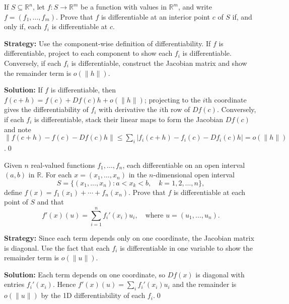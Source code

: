 \begin{problembox}
\begin{problemstatement}
If \( S \subseteq \mathbb{R}^n \), let \( f: S \to \mathbb{R}^m \) be a function with values in \( \mathbb{R}^m \), and write \( f = (f_1, \ldots, f_m) \). Prove that \( f \) is differentiable at an interior point \( c \) of \( S \) if, and only if, each \( f_i \) is differentiable at \( c \).
\end{problemstatement}
\end{problembox}

\noindent\textbf{Strategy:} Use the component-wise definition of differentiability. If \( f \) is differentiable, project to each component to show each \( f_i \) is differentiable. Conversely, if each \( f_i \) is differentiable, construct the Jacobian matrix and show the remainder term is \( o(\|h\|) \).

\bigskip\noindent\textbf{Solution:}
If $f$ is differentiable, then $f(c+h)=f(c)+Df(c)h+o(\|h\|)$; projecting to the $i$th coordinate gives the differentiability of $f_i$ with derivative the $i$th row of $Df(c)$. Conversely, if each $f_i$ is differentiable, stack their linear maps to form the Jacobian $Df(c)$ and note $\|f(c+h)-f(c)-Df(c)h\|\le\sum_i |f_i(c+h)-f_i(c)-Df_i(c)h|=o(\|h\|)$.\qed


\begin{problembox}
\begin{problemstatement}
Given \( n \) real-valued functions \( f_1, \ldots, f_n \), each differentiable on an open interval \( (a, b) \) in \( \mathbb{R} \). For each \( x = (x_1, \ldots, x_n) \) in the \( n \)-dimensional open interval
\[S = \{(x_1, \ldots, x_n): a < x_k < b, \quad k = 1, 2, \ldots, n\},\]
define \( f(x) = f_1(x_1) + \cdots + f_n(x_n) \). Prove that \( f \) is differentiable at each point of \( S \) and that
\[f'(x)(u) = \sum_{i=1}^{n} f_i'(x_i)u_i, \quad \text{where } u = (u_1, \ldots, u_n).\]
\end{problemstatement}
\end{problembox}

\noindent\textbf{Strategy:} Since each term depends only on one coordinate, the Jacobian matrix is diagonal. Use the fact that each \( f_i \) is differentiable in one variable to show the remainder term is \( o(\|u\|) \).

\bigskip\noindent\textbf{Solution:}
Each term depends on one coordinate, so $Df(x)$ is diagonal with entries $f_i'(x_i)$. Hence $f'(x)(u)=\sum_i f_i'(x_i)u_i$ and the remainder is $o(\|u\|)$ by the 1D differentiability of each $f_i$.\qed


